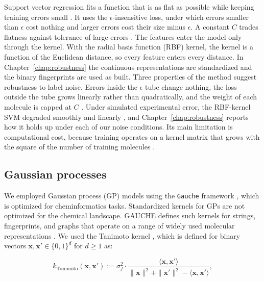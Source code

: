 Support vector regression fits a function that is as flat as possible while keeping training errors small \citep{Vapnik1995, Smola2004}. It uses the $\epsilon$-insensitive loss, under which errors smaller than $\epsilon$ cost nothing and larger errors cost their size minus $\epsilon$. A constant $C$ trades flatness against tolerance of large errors \citep{Cortes1995, Smola2004}. The features enter the model only through the kernel. With the radial basis function (RBF) kernel, the kernel is a function of the Euclidean distance, so every feature enters every distance. In Chapter~\ref{chap:robustness} the continuous representations are standardized and the binary fingerprints are used as built. Three properties of the method suggest robustness to label noise. Errors inside the $\epsilon$ tube change nothing, the loss outside the tube grows linearly rather than quadratically, and the weight of each molecule is capped at $C$ \citep{Smola2004}. Under simulated experimental error, the RBF-kernel SVM degraded smoothly and linearly \citep{Cortes2015}, and Chapter~\ref{chap:robustness} reports how it holds up under each of our noise conditions. Its main limitation is computational cost, because training operates on a kernel matrix that grows with the square of the number of training molecules \citep{Chang2011}.


\subsection{Gaussian processes}

We employed Gaussian process (GP) models using the \texttt{Gauche} framework \citep{gauche}, which is optimized for cheminformatics tasks. Standardized kernels for GPs are not optimized for the chemical landscape. GAUCHE defines such kernels for strings, fingerprints, and graphs that operate on a range of widely used molecular representations \citep{gauche}. We used the Tanimoto kernel \citep{Ralaivola2005, moss2020}, which is defined for binary vectors $\mathbf{x}, \mathbf{x}' \in \{0, 1\}^d$ for $d \geq 1$ as:

\begin{equation}
k_{\text{Tanimoto}}(\mathbf{x}, \mathbf{x}') := \sigma_f^2 \cdot \frac{\langle \mathbf{x}, \mathbf{x}' \rangle}{\|\mathbf{x}\|^2 + \|\mathbf{x}'\|^2 - \langle \mathbf{x}, \mathbf{x}' \rangle},
\label{eq:tanimoto_kernel}
\end{equation}

